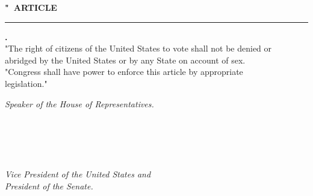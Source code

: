 \documentclass{article}
\begin{document}
{\begin{minipage}{\textwidth}
{\begin{minipage}{0.987\textwidth}
\begin{center}
                \vspace{0.5cm}
                \mdseries 
                {\Large \textbf{"\ ARTICLE }}\rule{0.15\textwidth}{1pt}{\Large \textbf{.}}\\
                \vspace{0.5cm}
                \hspace*{2.5cm} {\large "The right of citizens of the United States to vote shall not be denied or \\
                abridged by the United States or by any State on account of sex.\\
                \hspace*{2.5cm}"Congress shall have power to enforce this article by appropriate \\
                \hspace*{-10cm}legislation."}
            \end{center}
            \vspace{2cm}
            \hspace{10cm}\textit{\large Speaker of the House of Representatives.}\\
            \ \\
            \ \\
            \ \\
            \ \\
            \ \\
            \hspace*{10cm}\textit{Vice President of the United States and}\\ 
            \hspace*{14cm}\textit{President of the Senate.}\\
            \vspace{2.1cm}
\end{minipage}
}
\end{minipage}
}
\end{document}
